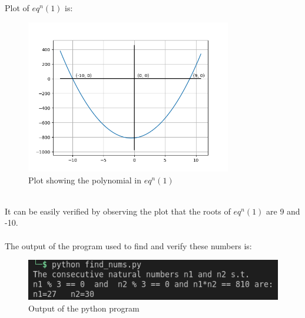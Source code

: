 \documentclass[11pt]{article}
\begin{document}
    Plot of $eq^n(1)$ is:\\
    \begin{figure}[h]
        \centering
        \includegraphics[width=0.8\textwidth]{plot.png}
        \caption{Plot showing the polynomial in $eq^n(1)$}
    \end{figure}\\
    It can be easily verified by observing the plot that the roots of $eq^n (1)$ are 9 and -10.\\\\

    The output of the program used to find and verify these numbers is:
    \begin{figure}[h]
        \includegraphics[width=\textwidth]{output.png}
        \caption{Output of the python program}
    \end{figure}
\end{document}
